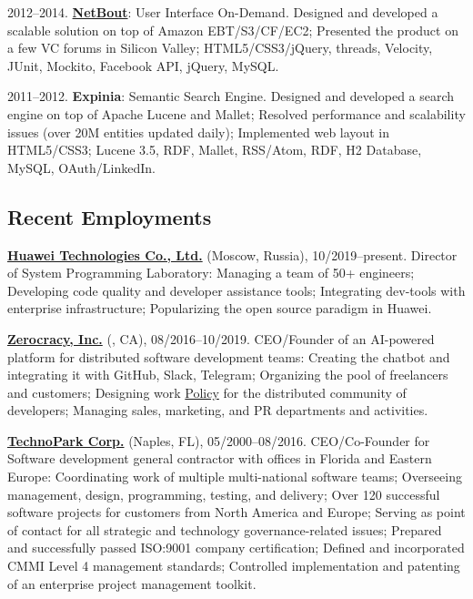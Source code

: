 \documentclass{vl}
\begin{document}
    2012--2014. \href{https://www.netbout.com}{\textbf{NetBout}}: User Interface On-Demand.
    Designed and developed a scalable solution on top of Amazon EBT/S3/CF/EC2;
    Presented the product on a few VC forums in Silicon Valley;
    HTML5/CSS3/jQuery, threads, Velocity, JUnit, Mockito, Facebook API, jQuery, MySQL.

    2011--2012. \textbf{Expinia}: Semantic Search Engine.
    Designed and developed a search engine on top of Apache Lucene and Mallet;
    Resolved performance and scalability issues (over 20M entities updated daily);
    Implemented web layout in HTML5/CSS3;
    Lucene 3.5, RDF, Mallet, RSS/Atom, RDF, H2 Database, MySQL, OAuth/LinkedIn.

    \subsection*{Recent Employments}

    \textbf{\href{https://www.huawei.com}{Huawei Technologies Co., Ltd.}} (Moscow, Russia), 10/2019--present.
    Director of System Programming Laboratory:
    Managing a team of 50+ engineers;
    Developing code quality and developer assistance tools;
    Integrating dev-tools with enterprise infrastructure;
    Popularizing the open source paradigm in Huawei.

    \textbf{\href{https://www.zerocracy.com}{Zerocracy, Inc.}} (, CA), 08/2016--10/2019.
    CEO/Founder of an AI-powered platform for distributed software development teams:
    Creating the chatbot and integrating it with GitHub, Slack, Telegram;
    Organizing the pool of freelancers and customers;
    Designing work \href{https://www.zerocracy.com/policy.html}{Policy} for the distributed community of developers;
    Managing sales, marketing, and PR departments and activities.

    \textbf{\href{https://www.technoparkcorp.com}{TechnoPark Corp.}} (Naples, FL), 05/2000--08/2016.
    CEO/Co-Founder for Software development general contractor with offices in Florida and Eastern Europe:
    Coordinating work of multiple multi-national software teams;
    Overseeing management, design, programming, testing, and delivery;
    Over 120 successful software projects for customers from North America and Europe;
    Serving as point of contact for all strategic and technology governance-related issues;
    Prepared and successfully passed ISO:9001 company certification;
    Defined and incorporated CMMI Level 4 management standards;
    Controlled implementation and patenting of an enterprise project management toolkit.
\end{document}
